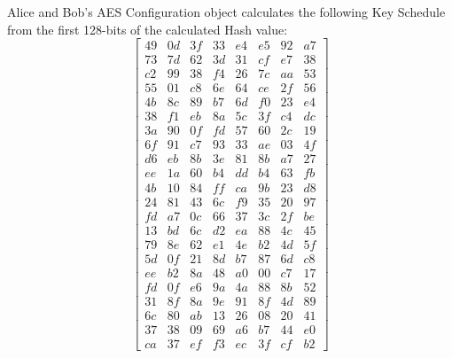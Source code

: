 \documentclass[journal]{IEEEtran}
\begin{document}
Alice and Bob's AES Configuration object calculates the following Key Schedule from the first 128-bits of the calculated Hash value:
$$
\begin{bmatrix}
49 & 0d & 3f & 33 & e4 & e5 & 92 & a7 \\
73 & 7d & 62 & 3d & 31 & cf & e7 & 38 \\
c2 & 99 & 38 & f4 & 26 & 7c & aa & 53 \\
55 & 01 & c8 & 6e & 64 & ce & 2f & 56 \\
4b & 8c & 89 & b7 & 6d & f0 & 23 & e4 \\
38 & f1 & eb & 8a & 5c & 3f & c4 & dc \\
3a & 90 & 0f & fd & 57 & 60 & 2c & 19 \\
6f & 91 & c7 & 93 & 33 & ae & 03 & 4f \\
d6 & eb & 8b & 3e & 81 & 8b & a7 & 27 \\
ee & 1a & 60 & b4 & dd & b4 & 63 & fb \\
4b & 10 & 84 & ff & ca & 9b & 23 & d8 \\
24 & 81 & 43 & 6c & f9 & 35 & 20 & 97 \\
fd & a7 & 0c & 66 & 37 & 3c & 2f & be \\
13 & bd & 6c & d2 & ea & 88 & 4c & 45 \\
79 & 8e & 62 & e1 & 4e & b2 & 4d & 5f \\
5d & 0f & 21 & 8d & b7 & 87 & 6d & c8 \\
ee & b2 & 8a & 48 & a0 & 00 & c7 & 17 \\
fd & 0f & e6 & 9a & 4a & 88 & 8b & 52 \\
31 & 8f & 8a & 9e & 91 & 8f & 4d & 89 \\
6c & 80 & ab & 13 & 26 & 08 & 20 & 41 \\
37 & 38 & 09 & 69 & a6 & b7 & 44 & e0 \\
ca & 37 & ef & f3 & ec & 3f & cf & b2
\end{bmatrix}
$$
\end{document}
